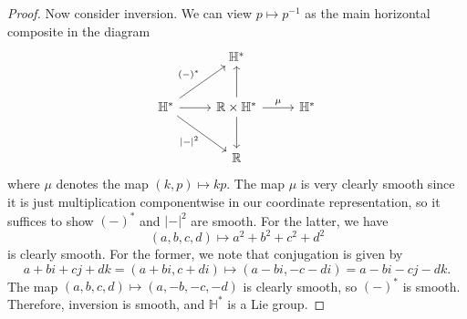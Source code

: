 \documentclass[11pt, letterpaper]{article}
\theoremstyle{plain}
\begin{document}
\begin{proof}
	Now consider inversion. We can view $p\mapsto p ^{-1} $ as the main horizontal composite in the diagram
	\[\begin{tikzcd}[row sep = 2.5em, column sep = 2.5em]
	 & \mathbb{H} ^* &  \\
		\mathbb{H} ^* \ar[" (-)^* ", ur] \ar[" \left| - \right| ^2 "', dr] \ar[r]  & \mathbb{R} \times \mathbb{H}^* \ar[" \mu  ", r] \ar[u] \ar[d]  & \mathbb{H} ^* \\
	 & \mathbb{R}  & 
	\end{tikzcd}\]
	where $\mu $ denotes the map $(k,p)\mapsto kp$. The map $\mu $ is very clearly smooth since it is just multiplication componentwise in our coordinate representation, so it suffices to show $(-)^*$ and $\left| - \right| ^2$ are smooth. For the latter, we have
	\[
		(a,b,c,d)\mapsto a^2+b^2+c^2+d^2
	\]
	is clearly smooth. For the former, we note that conjugation is given by
	\[
		a+bi+cj+dk=(a+bi,c+di)\mapsto (a-bi,-c-di) = a-bi-cj-dk
	.\]
	The map $(a,b,c,d)\mapsto (a,-b,-c,-d)$ is clearly smooth, so $(-)^*$ is smooth. Therefore, inversion is smooth, and $\mathbb{H} ^*$ is a Lie group.
\end{proof}
\end{document}
